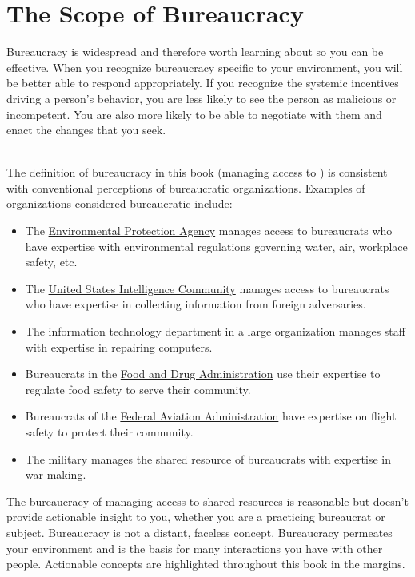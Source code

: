 \section{The Scope of Bureaucracy}
Bureaucracy is widespread and therefore worth learning about so you can be effective.  When you recognize bureaucracy specific to your environment, you will be better able to respond appropriately. If you recognize the systemic incentives driving a person's behavior, you are less likely to see the person as malicious or incompetent. You are also more likely to be able to negotiate with them and enact the changes that you seek.

\ \\

The definition of bureaucracy in this book (managing access to 
\iftoggle{glossarysubstitutionworks}{\glspl{shared resource}}{shared resources}) 
is consistent with conventional perceptions of bureaucratic organizations. 
Examples of organizations considered bureaucratic include:
  \begin{itemize}
      \item The \href{https://www.epa.gov/}{Environmental Protection Agency} manages access to bureaucrats who have expertise with environmental regulations governing water, air, workplace safety, etc.
      \item The \href{https://www.intelligence.gov/}{United States Intelligence Community} manages access to bureaucrats who have expertise in collecting information from foreign adversaries.
      \item The information technology department in a large organization manages staff with expertise in repairing computers.%
      \item Bureaucrats in the \href{https://www.fda.gov/}{Food and Drug Administration} use their expertise to regulate food safety to serve their community.%
      \item Bureaucrats of the \href{https://www.faa.gov/}{Federal Aviation Administration} have expertise on flight safety to protect their community.%
      \item The military manages the shared resource of bureaucrats with expertise in war-making.
  \end{itemize}

The bureaucracy of managing access to shared resources is reasonable but doesn't provide actionable insight to you, whether you are a practicing bureaucrat or subject. Bureaucracy is not a distant, faceless concept. Bureaucracy permeates your environment and is the basis for many interactions you have with other people. Actionable concepts are highlighted throughout this book in the margins.

